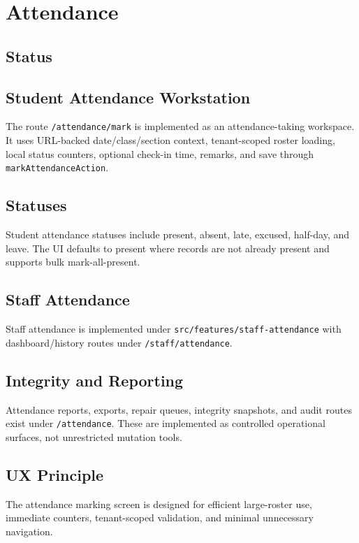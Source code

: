 \chapter{Attendance}
\section{Status}
\statusimplemented

\section{Student Attendance Workstation}
The route \texttt{/attendance/mark} is implemented as an attendance-taking workspace. It uses URL-backed date/class/section context, tenant-scoped roster loading, local status counters, optional check-in time, remarks, and save through \texttt{markAttendanceAction}.

\section{Statuses}
Student attendance statuses include present, absent, late, excused, half-day, and leave. The UI defaults to present where records are not already present and supports bulk mark-all-present.

\section{Staff Attendance}
Staff attendance is implemented under \texttt{src/features/staff-attendance} with dashboard/history routes under \texttt{/staff/attendance}.

\section{Integrity and Reporting}
Attendance reports, exports, repair queues, integrity snapshots, and audit routes exist under \texttt{/attendance}. These are implemented as controlled operational surfaces, not unrestricted mutation tools.

\section{UX Principle}
The attendance marking screen is designed for efficient large-roster use, immediate counters, tenant-scoped validation, and minimal unnecessary navigation.
